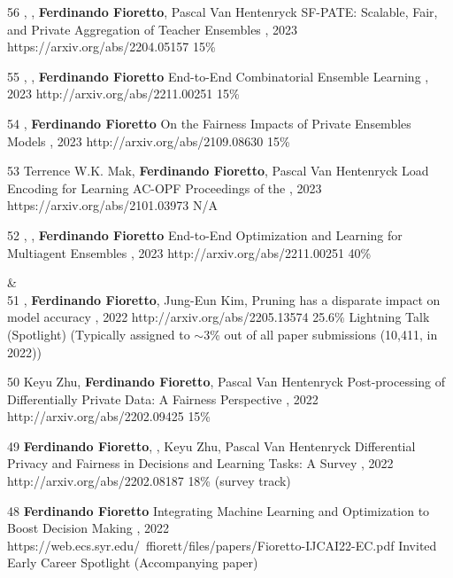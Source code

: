 \begin{pubs}
\confentry
    {56} %
	{, , {\bf Ferdinando Fioretto}, Pascal Van Hentenryck}
	{SF-PATE: Scalable, Fair, and Private Aggregation of Teacher Ensembles}
    {\procIJCAI, 2023}
	{https://arxiv.org/abs/2204.05157}
    {15\%}

\confentry
    {55} %
	{, , {\bf Ferdinando Fioretto}}
	{End-to-End Combinatorial Ensemble Learning}
    {\procIJCAI, 2023}
	{http://arxiv.org/abs/2211.00251}
    {15\%}

\confentry
    {54} %
	{, {\bf Ferdinando Fioretto}}
	{On the Fairness Impacts of Private Ensembles Models}
    {\procIJCAI, 2023}
	{http://arxiv.org/abs/2109.08630}
    {15\%}

\confentry
	{53} %
	{Terrence W.K. Mak, {\bf Ferdinando Fioretto}, Pascal Van Hentenryck}
	{Load Encoding for Learning AC-OPF}
	{Proceedings of the , 2023}
	{https://arxiv.org/abs/2101.03973}
	{N/A}

\confentry
    {52} %
	{, , {\bf Ferdinando Fioretto}}
	{End-to-End Optimization and Learning for Multiagent Ensembles}
    {\procAAMAS, 2023}
	{http://arxiv.org/abs/2211.00251}
    {40\%}

{}&\nemph{\rule{0.5\linewidth}{0.5pt}}\\[1em]

\confentryAwd
	{51} %
	{, {\bf Ferdinando Fioretto}, Jung-Eun Kim, }
	{Pruning has a disparate impact on model accuracy}
	{\procNeurIPS, 2022}
	{http://arxiv.org/abs/2205.13574}
	{25.6\%}
	{Lightning Talk (Spotlight)}
	{(Typically assigned to $\sim$3\% out of all paper submissions (10,411, in 2022))}

	\confentry
	{50} %
	{Keyu Zhu, {\bf Ferdinando Fioretto}, Pascal Van Hentenryck}
	{Post-processing of Differentially Private Data: A Fairness Perspective}
	{\procIJCAI, 2022}
	{http://arxiv.org/abs/2202.09425}	
	{15\%}

	\confentry
	{49} %
	{{\bf Ferdinando Fioretto}, , Keyu Zhu, Pascal Van Hentenryck}
	{Differential Privacy and Fairness in Decisions and Learning Tasks: A Survey}
	{\procIJCAI, 2022}
	{http://arxiv.org/abs/2202.08187}	
	{18\% (survey track)}

	\confentryAwd
	{48} %
	{{\bf Ferdinando Fioretto}}
	{Integrating Machine Learning and Optimization to Boost Decision Making}
	{\procIJCAI, 2022}
	{https://web.ecs.syr.edu/~ffiorett/files/papers/Fioretto-IJCAI22-EC.pdf}	
	{Invited}
	{Early Career Spotlight}
	{(Accompanying paper)}


\end{pubs}
